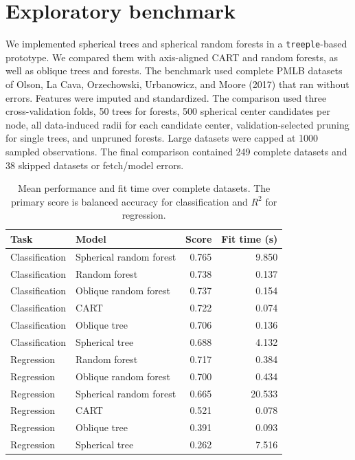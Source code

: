 \documentclass[12pt]{article}
\begin{document}
\section{Exploratory benchmark}

We implemented spherical trees and spherical random forests in a
\texttt{treeple}-based prototype. We compared them with axis-aligned CART and
random forests, as well as oblique trees and forests. The benchmark used
complete PMLB datasets of Olson, La Cava, Orzechowski, Urbanowicz, and Moore
(2017) that ran without errors. Features were imputed and standardized. The
comparison used three cross-validation folds, 50 trees for forests, 500
spherical center candidates per node, all data-induced radii for each candidate
center, validation-selected pruning for single trees, and unpruned forests.
Large datasets were capped at 1000 sampled observations. The final comparison
contained 249 complete datasets and 38 skipped datasets or fetch/model errors.

\begin{table}[t]
    \centering
    \caption{Mean performance and fit time over complete datasets. The primary
    score is balanced accuracy for classification and $R^2$ for regression.}
    \label{tab:benchmark}
    \begin{tabular}{llrr}
        \toprule
        Task & Model & Score & Fit time (s)\\
        \midrule
        Classification & Spherical random forest & 0.765 & 9.850\\
        Classification & Random forest & 0.738 & 0.137\\
        Classification & Oblique random forest & 0.737 & 0.154\\
        Classification & CART & 0.722 & 0.074\\
        Classification & Oblique tree & 0.706 & 0.136\\
        Classification & Spherical tree & 0.688 & 4.132\\
        \midrule
        Regression & Random forest & 0.717 & 0.384\\
        Regression & Oblique random forest & 0.700 & 0.434\\
        Regression & Spherical random forest & 0.665 & 20.533\\
        Regression & CART & 0.521 & 0.078\\
        Regression & Oblique tree & 0.391 & 0.093\\
        Regression & Spherical tree & 0.262 & 7.516\\
        \bottomrule
    \end{tabular}
\end{table}
\end{document}
